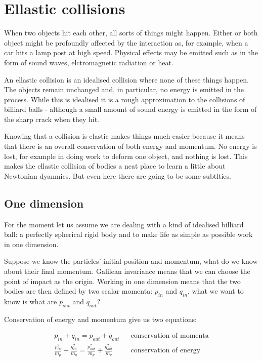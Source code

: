 \documentclass[main.tex]{subfiles}
\begin{document}
\chapter{Ellastic collisions}
When two objects hit each other, all sorts of things might happen. Either or both object might be profoundly affected by the interaction as, for example, when a car hits a lamp post at high speed. Physical effects may be emitted such as in the form of sound waves, elctromagnetic radiation or heat.

An ellastic collision is an idealised collision where none of these things happen. The objects remain unchanged and, in particular, no energy is emitted in the process. While this is idealised it is a rough approximation to the collisions of billiard balls - although a small amount of sound energy is emitted in the form of the sharp crack when they hit.

Knowing that a collision is elastic makes things much easier because it means that there is an overall conservation of both energy and momentum. No energy is lost, for example in doing work to deform one object, and nothing is lost. This makes the ellastic collision of bodies a neat place to learn a little about Newtonian dyanmics. But even here there are going to be some subtlties.

\section{One dimension}
For the moment let us assume we are dealing with a kind of idealised billiard ball: a perfectly spherical rigid body and to make life as simple as possible work in one dimension.

Suppose we know the particles' initial position and momentum, what do we know about their final momentum. Galilean invariance means that we can choose the point of impact as the origin. Working in one dimension means that the two bodies are then defined by two scalar momenta: $p_{in}$ and $q_{in}$, what we want to know is what are $p_{out}$ and $q_{out}$?

Conservation of energy and momentum give us two equations:

\begin{align}
   p_{in} + q_{in} = p_{out} +q_{out} && \text{conservation of momenta} \label{eq:cm1}\\
  \frac{p_{in}^2}{m_p} + \frac{q_{in}^2}{m_q} = \frac{p_{out}^2}{m_p} +\frac{q_{out}^2}{m_q} && \text{conservation of energy} \label{eq:ce1}
\end{align}
\end{document}
